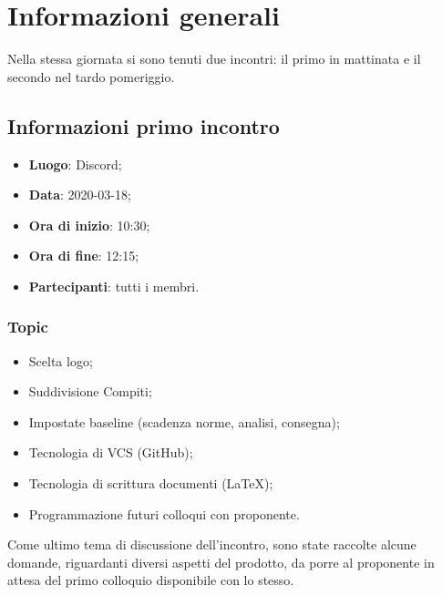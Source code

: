 \usepackage{comment}
\section{Informazioni generali}
Nella stessa giornata si sono tenuti due incontri: il primo in mattinata e il secondo nel tardo pomeriggio.
\subsection{Informazioni primo incontro}
\begin{itemize}
\item \textbf{Luogo}: Discord\glo;
\item \textbf{Data}: 2020-03-18;
\item \textbf{Ora di inizio}: 10:30;
\item \textbf{Ora di fine}: 12:15;
\item \textbf{Partecipanti}: tutti i membri.
\end{itemize}

\subsubsection{Topic}

\begin{itemize}
\item Scelta logo;
\item Suddivisione Compiti;
\item Impostate baseline (scadenza norme, analisi, consegna);
\item Tecnologia di VCS (GitHub);
\item Tecnologia di scrittura documenti (LaTeX);
\item Programmazione futuri colloqui con proponente.
\end{itemize}

Come ultimo tema di discussione dell'incontro, sono state raccolte alcune domande, riguardanti diversi aspetti del prodotto, da porre al proponente in attesa del primo colloquio disponibile con lo stesso. 

